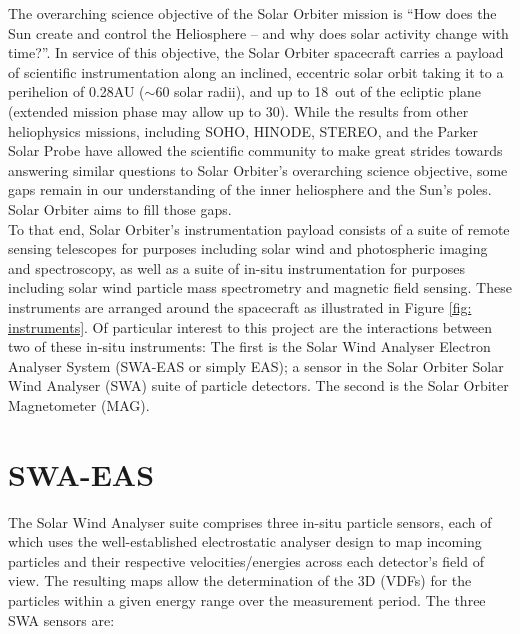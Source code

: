The overarching science objective of the Solar Orbiter mission is “How does the Sun create and control the Heliosphere – and why does solar activity change with time?”\cite{muller2020}. In service of this objective, the Solar Orbiter spacecraft carries a payload of scientific instrumentation along an inclined, eccentric solar orbit taking it to a perihelion of 0.28AU (\(\sim60\) solar radii), and up to 18\degree\ out of the ecliptic plane (extended mission phase may allow up to 30\degree). While the results from other heliophysics missions, including SOHO\cite{domingo1995}, HINODE\cite{kosugi2007}, STEREO\cite{kaiser2008}, and the Parker Solar Probe\cite{fox2016} have allowed the scientific community to make great strides towards answering similar questions to Solar Orbiter's overarching science objective, some gaps remain in our understanding of the inner heliosphere and the Sun's poles\cite{muller2020}. Solar Orbiter aims to fill those gaps.
\\

To that end, Solar Orbiter's instrumentation payload consists of a suite of remote sensing telescopes for purposes including solar wind and photospheric imaging and spectroscopy, as well as a suite of in-situ instrumentation for purposes including solar wind particle mass spectrometry and magnetic field sensing. These instruments are arranged around the spacecraft as illustrated in Figure \ref{fig: instruments}. Of particular interest to this project are the interactions between two of these in-situ instruments: The first is the Solar Wind Analyser Electron Analyser System (SWA-EAS or simply EAS); a sensor in the Solar Orbiter Solar Wind Analyser (SWA) suite of particle detectors. The second is the Solar Orbiter Magnetometer (MAG).

\section{SWA-EAS}

The Solar Wind Analyser suite comprises three in-situ particle sensors, each of which uses the well-established  electrostatic analyser design\cite{collinson2010}\cite{owen2020} to map incoming particles and their respective velocities/energies across each detector's field of view. The resulting maps allow the determination of the 3D  (VDFs) for the particles within a given energy range over the measurement period. The three SWA sensors are: 

